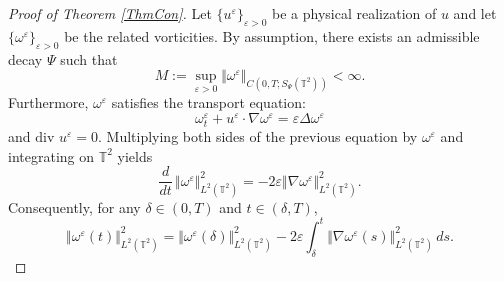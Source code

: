 \documentclass[11pt, a4paper,leqno]{amsart}
\theoremstyle{plain}
\numberwithin{equation}{section}
\theoremstyle{definition}
\theoremstyle{remark}
\def\T{\mathbb{T}}
\begin{document}
\begin{proof}
[Proof of Theorem \ref{ThmCon}] Let $\{u^\varepsilon\}_{\varepsilon > 0}$ be a physical realization of $u$ and let $\{\omega^{\varepsilon}\}_{\varepsilon > 0}$ be the related vorticities. By assumption, there exists an admissible decay $\Psi$ such that  
\begin{equation}\label{109}
M:=\sup_{\varepsilon>0}\Vert\omega^{\varepsilon}\Vert
_{C(0,T;S_{\Psi}(\T^2))}<\infty.
\end{equation}
Furthermore,  $\omega^{\varepsilon}$ satisfies the transport
equation:
\[
\omega_{t}^{\varepsilon}+u^{\varepsilon}\cdot\nabla\omega^{\varepsilon}=\varepsilon\Delta\omega^{\varepsilon}%
\]
and $\text{div }u^{\varepsilon}=0$. Multiplying both sides of the previous equation by
$\omega^{\varepsilon}$ and integrating on $\mathbb{T}^{2}$ yields
\[
\frac{d}{dt}\,\Vert\omega^{\varepsilon}\Vert_{L^{2}(\T^2)}^{2}=-2\varepsilon\Vert\nabla\omega^{\varepsilon
}\Vert_{L^{2}(\T^2)}^{2}.
\]
Consequently, for any $\delta\in(0,T)$ and $t\in(\delta,T)$,
\begin{equation}
\Vert\omega^{\varepsilon}(t)\Vert_{L^{2}(\T^2)}^{2}=\Vert\omega^{\varepsilon}(\delta)\Vert_{L^{2}(\T^2)
}^{2}-2\varepsilon\int_{\delta}^{t}\Vert\nabla\omega^{\varepsilon}(s)\Vert_{L^{2}(\T^2)}%
^{2}\,ds.\label{0.9}%
\end{equation}



\end{proof}
\end{document}

